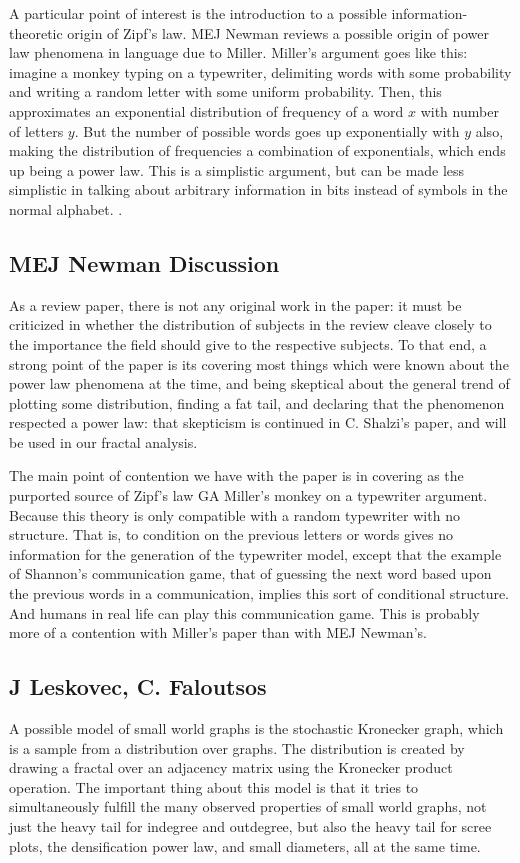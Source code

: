 \documentclass[12pt]{article}
\begin{document}
A particular point of interest is the introduction to a possible information-theoretic origin of Zipf's law. MEJ Newman reviews a possible origin of power law phenomena in language due to Miller. Miller's argument goes like this: imagine a monkey typing on a typewriter, delimiting words with some probability and writing a random letter with some uniform probability. Then, this approximates an exponential distribution of frequency of a word $x$ with number of letters $y$. But the number of possible words goes up exponentially with $y$ also, making the distribution of frequencies a combination of exponentials, which ends up being a power law. This is a simplistic argument, but can be made less simplistic in talking about arbitrary information in bits instead of symbols in the normal alphabet. %
. 
\subsection{MEJ Newman Discussion}

As a review paper, there is not any original work in the paper: it must be criticized in whether the distribution of subjects in the review cleave closely to the importance the field should give to the respective subjects. To that end, a strong point of the paper is its covering most things which were known about the power law phenomena at the time, and being skeptical about the general trend of plotting some distribution, finding a fat tail, and declaring that the phenomenon respected a power law: that skepticism is continued in C. Shalzi's paper, and will be used in our fractal analysis. %

The main point of contention we have with the paper is in covering as the purported source of Zipf's law GA Miller's monkey on a typewriter argument. Because this theory is only compatible with a random typewriter with no structure. That is, to condition on the previous letters or words gives no information for the generation of the typewriter model, except that the example of Shannon's communication game, that of guessing the next word based upon the previous words in a communication, implies this sort of conditional structure. And humans in real life can play this communication game. This is probably more of a contention with Miller's paper than with MEJ Newman's.

\subsection{J Leskovec, C. Faloutsos}
A possible model of small world graphs is the stochastic Kronecker graph, which is a sample from a distribution over graphs. The distribution is created by drawing a fractal over an adjacency matrix using the Kronecker product operation. The important thing about this model is that it tries to simultaneously fulfill the many observed properties of small world graphs, not just the heavy tail for indegree and outdegree, but also the heavy tail for scree plots, the densification power law, and small diameters, all at the same time.
\end{document}
